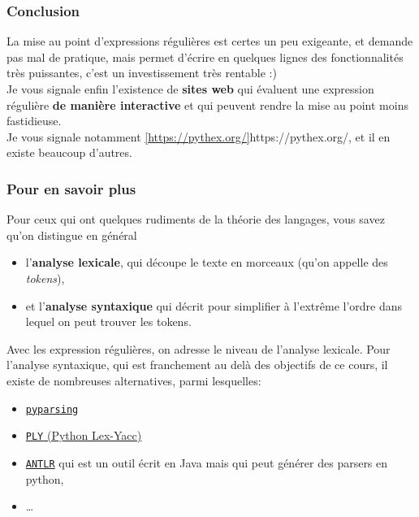     \hypertarget{conclusion}{%
\subsubsection{Conclusion}\label{conclusion}}

    La mise au point d'expressions régulières est certes un peu exigeante,
et demande pas mal de pratique, mais permet d'écrire en quelques lignes
des fonctionnalités très puissantes, c'est un investissement très
rentable :)\\

    Je vous signale enfin l'existence de \textbf{sites web} qui évaluent une
expression régulière \textbf{de manière interactive} et qui peuvent
rendre la mise au point moins fastidieuse.\\

Je vous signale notamment \ref{https://pythex.org/}{https://pythex.org/}, et il en existe beaucoup
d'autres.

    \hypertarget{pour-en-savoir-plus}{%
\subsubsection{Pour en savoir plus}\label{pour-en-savoir-plus}}

    Pour ceux qui ont quelques rudiments de la théorie des langages, vous
savez qu'on distingue en général

\begin{itemize}
	\item 
	l'\textbf{analyse lexicale}, qui
	découpe le texte en morceaux (qu'on appelle des \emph{tokens}),
	\item
	et l'\textbf{analyse syntaxique} qui décrit pour simplifier à l'extrême
	l'ordre dans lequel on peut trouver les tokens.
\end{itemize}

Avec les expression régulières, on adresse le niveau de l'analyse
lexicale. Pour l'analyse syntaxique, qui est franchement au delà des
objectifs de ce cours, il existe de nombreuses alternatives, parmi
lesquelles:

\begin{itemize}
	\item 
	\href{http://pyparsing.wikispaces.com/Download+and+Installation}{\texttt{pyparsing}}
	\item
	\href{http://www.dabeaz.com/ply/}{\texttt{PLY} (Python Lex-Yacc)}
	\item
	\href{http://www.antlr.org}{\texttt{ANTLR}} qui est un outil écrit en
	Java mais qui peut générer des parsers en python,
	\item
	\ldots{}
\end{itemize}